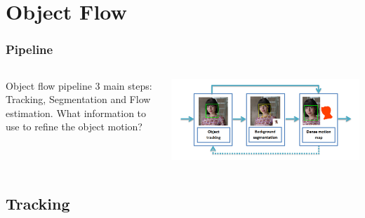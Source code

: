 \documentclass{beamer}
\begin{document}
\section{Object Flow}

\begin{frame}
	\frametitle{Pipeline}
  \begin{columns}[T]
    \begin{column}{.5\textwidth}
		\begin{block}{Object flow pipeline}
3 main steps: Tracking, Segmentation and Flow estimation.
What information to use to refine the object motion?	
		\end{block}
    \end{column}
    \begin{column}{.5\textwidth}
		\includegraphics[width=1.0\textwidth]{../images/system.png}
    \end{column}
  \end{columns}
\end{frame}


\subsection{Tracking}
\end{document}
